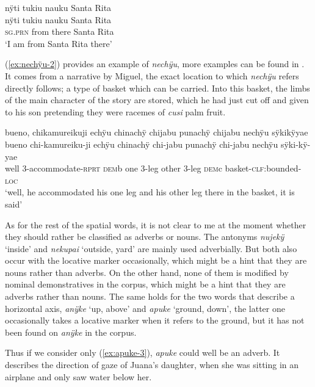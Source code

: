 \ea\label{ex:nauku-2}
\begingl
\glpreamble nÿti tukiu nauku Santa Rita\\
\gla nÿti tukiu nauku {Santa Rita}\\
\textsc{sg.prn} from there {Santa Rita}\\
\glft ‘I am from Santa Rita there’
\endgl
\trailingcitation{[cux-120410ls.010]}
\xe


(\ref{ex:nechÿu-2}) provides an example of \textit{nechÿu}, more examples can be found in . It comes from a narrative by Miguel, the exact location to which \textit{nechÿu} refers directly follows; a type of basket which can be carried. Into this basket, the limbs of the main character of the story are stored, which he had just cut off and given to his son pretending they were racemes of \textit{cusi} palm fruit.

\ea\label{ex:nechÿu-2}
\begingl
\glpreamble bueno, chikamureikuji echÿu chinachÿ chijabu punachÿ chijabu nechÿu sÿkikÿyae\\
\gla bueno chi-kamureiku-ji echÿu chinachÿ chi-jabu punachÿ chi-jabu nechÿu sÿki-kÿ-yae\\
\glb well 3-accommodate-\textsc{rprt} \textsc{dem}b one 3-leg other 3-leg \textsc{dem}c basket-\textsc{clf}:bounded-\textsc{loc}\\
\glft ‘well, he accommodated his one leg and his other leg there in the basket, it is said’
\endgl
\trailingcitation{[mox-n110920l.110]}
\xe
{}


As for the rest of the spatial words, it is not clear to me at the moment whether they should rather be classified as adverbs or nouns. The antonyms \textit{nujekÿ} ‘inside’ and \textit{nekupai} ‘outside, yard’ are mainly used adverbially. But both also occur with the locative marker occasionally, which might be a hint that they are nouns rather than adverbs. On the other hand, none of them is modified by nominal demonstratives in the corpus, which might be a hint that they are adverbs rather than nouns. The same holds for the two words that describe a horizontal axis, \textit{anÿke} ‘up, above’ and \textit{apuke} ‘ground, down’, the latter one occasionally takes a locative marker when it refers to the ground, but it has not been found on \textit{anÿke} in the corpus.

Thus if we consider only (\ref{ex:apuke-3}), \textit{apuke} could well be an adverb. It describes the direction of gaze of Juana’s daughter, when she was sitting in an airplane and only saw water below her.

